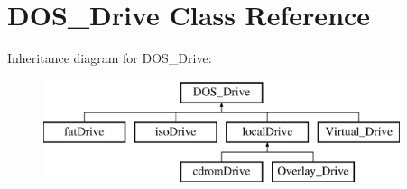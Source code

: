 \hypertarget{classDOS__Drive}{\section{D\-O\-S\-\_\-\-Drive Class Reference}
\label{classDOS__Drive}
}
Inheritance diagram for D\-O\-S\-\_\-\-Drive\-:\begin{figure}[H]
\begin{center}
\leavevmode
\includegraphics[height=3.000000cm]{classDOS__Drive}
\end{center}
\end{figure}
